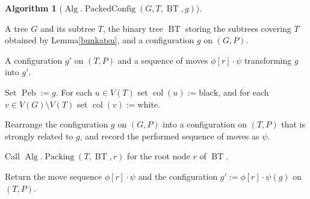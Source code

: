 \documentclass[letter,11pt]{article}
\theoremstyle{definition}
\theoremstyle{definition}
\newtheorem{alg}{Algorithm}
\DeclareMathOperator{\BT}{BT}
\DeclareMathOperator{\Peb}{Peb}
\DeclareMathOperator{\col}{col}
\DeclareMathOperator{\Alg}{Alg}
\DeclareMathOperator{\PacCon}{PackedConfig}
\DeclareMathOperator{\Pac}{Packing}
\newcommand{\1}{\boldmath$~1~$\unboldmath}
\newcommand{\tume}{\hspace*{0.2em}}
\newcommand{\maru}[1]{{\ooalign{\hfill$\small#1$\hfill\crcr\scalebox{1.3}{$\bigcirc$}}}}
\newenvironment{alg-enumerate}{%
  \begin{enumerate}%
   \renewcommand{\theenumi}{\arabic{enumi}}%
   \renewcommand{\labelenumi}{\rm{{\maru{\theenumi}}\tume\/}}%
   \renewcommand{\labelenumii}{\rm{$(${\maru{\theenumi}}-\theenumii$)$\tume\/}}%
 }{\end{enumerate}%
}
\newcommand{\namelistlabel}[1]{\hspace*{10pt}\mbox{#1}:\hspace{\fill}}
\newenvironment{namelist}[1]{%
    \begin{list}{}
      {\let\makelabel\namelistlabel
      \settowidth{\labelwidth}{#1}
      \setlength{\leftmargin}{1.1\labelwidth}
      \setlength{\labelsep}{5pt}
      \setlength{\parsep}{0pt}}
  }{%
  \end{list}}
\begin{document}
\begin{alg}[$\Alg.\PacCon(G, T, \BT, g)$]\hfill
\begin{namelist}{OUTPUT}
\item[\sl Input]
A tree $G$ and its subtree $T$, the binary tree $\BT$ storing the
subtrees covering $T$ obtained by Lemma\tume\ref{bunkatsu},
and a configuration $g$ on $(G,P)$.

\item[\sl Output]
A configuration $g'$ on $(T,P)$ and a sequence of moves
$\phi[r]\cdot\psi$ transforming $g$ into $g'$.
\end{namelist}

\begin{alg-enumerate}

\item
Set $\Peb := g$.
For each $u\in V(T)$ set $\col(u):=\mathrm{black}$,
and for each $v\in V(G)\setminus V(T)$ set $\col(v):=\mathrm{white}$.

\item
Rearrange the configuration $g$ on $(G,P)$ into a configuration on
$(T,P)$ that is strongly related to $g$, and record the performed
sequence of moves as $\psi$.

\item
Call $\Alg.\Pac(T,\BT,r)$ for the root node $r$ of $\BT$.

\item
Return the move sequence $\phi[r]\cdot\psi$ and the configuration
$g' := \phi[r]\cdot\psi(g)$ on $(T,P)$.

\end{alg-enumerate}
\end{alg}
\end{document}
